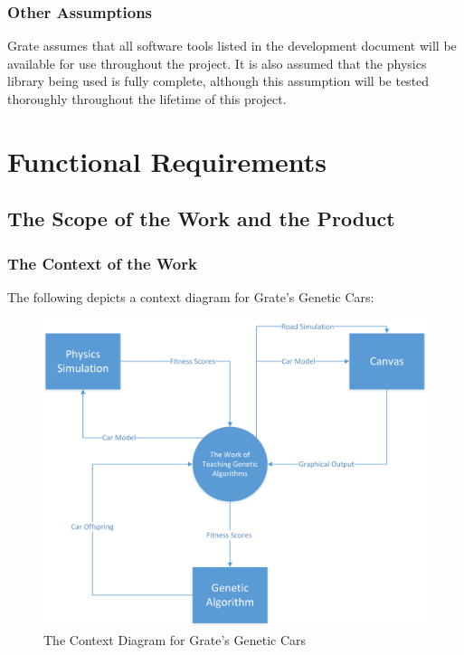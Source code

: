 \documentclass[12pt, titlepage]{article}
\begin{document}
\subsubsection{Other Assumptions}

Grate assumes that all software tools listed in the development document will be available for use throughout the project. It is also assumed that the physics library being used is fully complete, although this assumption will be tested thoroughly throughout the lifetime of this project.

\section{Functional Requirements}

\subsection{The Scope of the Work and the Product}

\subsubsection{The Context of the Work}
The following depicts a context diagram for Grate's Genetic Cars:

\begin{figure}[H]
  \includegraphics[scale=0.66]{ContextDiagram.png}
  \caption{The Context Diagram for Grate's Genetic Cars}
\end{figure}
\end{document}
